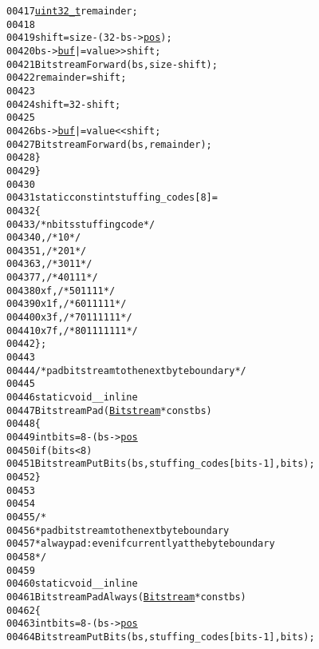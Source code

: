 \begin{footnotesize}
\begin{alltt}
00417                 \hyperlink{_types_8h_a04909d1366bb244ff2482beb51635f37}{uint32_t} remainder;
00418 
00419                 shift = size - (32 - bs->\hyperlink{struct_bitstream_ac7479c4c4e57d10bbfdd90baf6e731a4}{pos});
00420                 bs->\hyperlink{struct_bitstream_aa6e7d5fa7c3bcfaac4cda5c4b07f8aa1}{buf} |= value >> shift;
00421                 BitstreamForward(bs, size - shift);
00422                 remainder = shift;
00423 
00424                 shift = 32 - shift;
00425 
00426                 bs->\hyperlink{struct_bitstream_aa6e7d5fa7c3bcfaac4cda5c4b07f8aa1}{buf} |= value << shift;
00427                 BitstreamForward(bs, remainder);
00428         \}
00429 \}
00430 
00431 \textcolor{keyword}{static} \textcolor{keyword}{const} \textcolor{keywordtype}{int} stuffing\_codes[8] =
00432 \{
00433                 \textcolor{comment}{/* nbits     stuffing code */}
00434         0,              \textcolor{comment}{/* 1          0 */}
00435         1,              \textcolor{comment}{/* 2          01 */}
00436         3,              \textcolor{comment}{/* 3          011 */}
00437         7,              \textcolor{comment}{/* 4          0111 */}
00438         0xf,    \textcolor{comment}{/* 5          01111 */}
00439         0x1f,   \textcolor{comment}{/* 6          011111 */}
00440         0x3f,   \textcolor{comment}{/* 7          0111111 */}
00441         0x7f,   \textcolor{comment}{/* 8          01111111 */}
00442 \};
00443 
00444 \textcolor{comment}{/* pad bitstream to the next byte boundary */}
00445 
00446 \textcolor{keyword}{static} \textcolor{keywordtype}{void} \_\_inline
00447 BitstreamPad(\hyperlink{struct_bitstream}{Bitstream} * \textcolor{keyword}{const} bs)
00448 \{
00449         \textcolor{keywordtype}{int} bits = 8 - (bs->\hyperlink{struct_bitstream_ac7479c4c4e57d10bbfdd90baf6e731a4}{pos} % 8);
00450         \textcolor{keywordflow}{if} (bits < 8)
00451                 BitstreamPutBits(bs, stuffing\_codes[bits - 1], bits);
00452 \}
00453 
00454 
00455 \textcolor{comment}{/*}
00456 \textcolor{comment}{ * pad bitstream to the next byte boundary}
00457 \textcolor{comment}{ * alway pad: even if currently at the byte boundary}
00458 \textcolor{comment}{ */}
00459 
00460 \textcolor{keyword}{static} \textcolor{keywordtype}{void} \_\_inline
00461 BitstreamPadAlways(\hyperlink{struct_bitstream}{Bitstream} * \textcolor{keyword}{const} bs)
00462 \{
00463         \textcolor{keywordtype}{int} bits = 8 - (bs->\hyperlink{struct_bitstream_ac7479c4c4e57d10bbfdd90baf6e731a4}{pos} % 8);
00464         BitstreamPutBits(bs, stuffing\_codes[bits - 1], bits);

\end{alltt}
\end{footnotesize}
